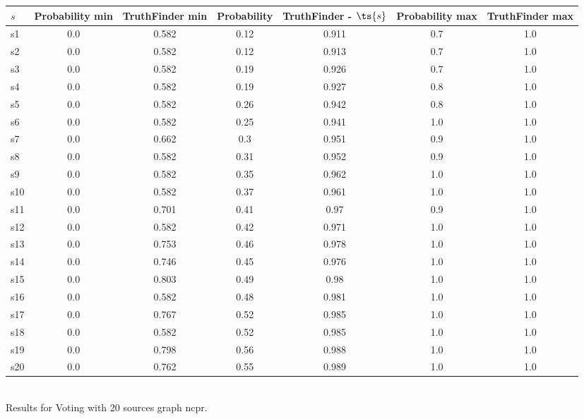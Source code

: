 \documentclass{article}
\begin{document}
\noindent\begin{tabular}{|l|c|c|c|c|c|c|}
\hline
$s$& Probability min & TruthFinder min & Probability & TruthFinder - $\ts{s}$ & Probability max & TruthFinder max\\
\hline
s1 &0.0 & 0.582 & 0.12 & 0.911 & 0.7 & 1.0\\
\hline
s2 &0.0 & 0.582 & 0.12 & 0.913 & 0.7 & 1.0\\
\hline
s3 &0.0 & 0.582 & 0.19 & 0.926 & 0.7 & 1.0\\
\hline
s4 &0.0 & 0.582 & 0.19 & 0.927 & 0.8 & 1.0\\
\hline
s5 &0.0 & 0.582 & 0.26 & 0.942 & 0.8 & 1.0\\
\hline
s6 &0.0 & 0.582 & 0.25 & 0.941 & 1.0 & 1.0\\
\hline
s7 &0.0 & 0.662 & 0.3 & 0.951 & 0.9 & 1.0\\
\hline
s8 &0.0 & 0.582 & 0.31 & 0.952 & 0.9 & 1.0\\
\hline
s9 &0.0 & 0.582 & 0.35 & 0.962 & 1.0 & 1.0\\
\hline
s10 &0.0 & 0.582 & 0.37 & 0.961 & 1.0 & 1.0\\
\hline
s11 &0.0 & 0.701 & 0.41 & 0.97 & 0.9 & 1.0\\
\hline
s12 &0.0 & 0.582 & 0.42 & 0.971 & 1.0 & 1.0\\
\hline
s13 &0.0 & 0.753 & 0.46 & 0.978 & 1.0 & 1.0\\
\hline
s14 &0.0 & 0.746 & 0.45 & 0.976 & 1.0 & 1.0\\
\hline
s15 &0.0 & 0.803 & 0.49 & 0.98 & 1.0 & 1.0\\
\hline
s16 &0.0 & 0.582 & 0.48 & 0.981 & 1.0 & 1.0\\
\hline
s17 &0.0 & 0.767 & 0.52 & 0.985 & 1.0 & 1.0\\
\hline
s18 &0.0 & 0.582 & 0.52 & 0.985 & 1.0 & 1.0\\
\hline
s19 &0.0 & 0.798 & 0.56 & 0.988 & 1.0 & 1.0\\
\hline
s20 &0.0 & 0.762 & 0.55 & 0.989 & 1.0 & 1.0\\
\hline
\end{tabular}\\

\noindent Results for Voting with 20 sources graph ncpr.
\end{document}
